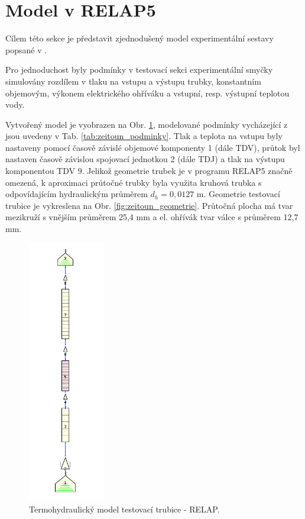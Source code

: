 \section{Model v RELAP5}
Cílem této sekce je představit zjednodušený model experimentální sestavy popsané v \cite{zeitoun1994subcooled}.

Pro jednoduchost byly podmínky v testovací sekci experimentální smyčky simulovány rozdílem v tlaku na vstupu a výstupu trubky, konstantním objemovým, výkonem elektrického ohříváku a vstupní, resp. výstupní teplotou vody.  

 Vytvořený model je vyobrazen na Obr. \ref{fig:zeitoun_model},  modelované podmínky vycházející z \cite{zeitoun1994subcooled} jsou uvedeny v Tab. \ref{tab:zeitoun_podminky}. Tlak a teplota na vstupu byly nastaveny pomocí časově závislé objemové komponenty 1 (dále TDV), průtok byl nastaven časově závislou spojovací jednotkou 2 (dále TDJ) a tlak na výstupu komponentou TDV 9. Jelikož geometrie trubek je v programu RELAP5 značně omezená, k aproximaci průtočné trubky byla využita kruhová trubka s odpovídajícím hydraulickým průměrem $ d_h = 0,0127 $ m. Geometrie testovací trubice je vykreslena na Obr. \ref{fig:zeitoun_geometrie}. Průtočná plocha má tvar mezikruží s vnějším průměrem 25,4 mm a el. ohřívák tvar válce s průměrem 12,7 mm.
 \begin{figure}[h]
	\centering
	\includegraphics[width=0.3\textwidth]{./03_benchmark/obrazky/zeitoun_model.png}
	\caption{Termohydraulický model testovací trubice - RELAP.}
	\label{fig:zeitoun_model}
\end{figure}
